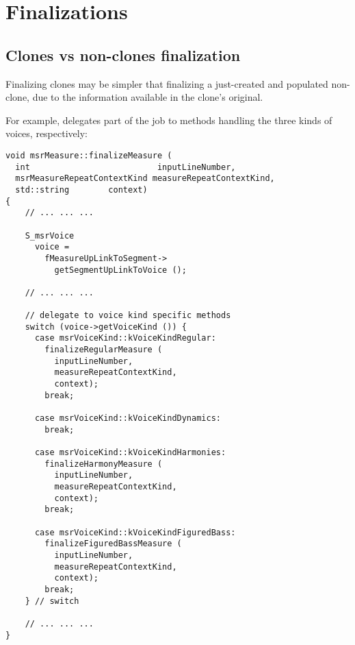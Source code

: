 



\chapter{Finalizations}

\section{Clones vs non-clones finalization}

Finalizing clones may be simpler that finalizing a just-created and populated non-clone, due to the information available in the clone's original.

For example,  delegates part of the job to methods handling the three kinds of voices, respectively:
\begin{lstlisting}[language=CPlusPlus]
void msrMeasure::finalizeMeasure (
  int                          inputLineNumber,
  msrMeasureRepeatContextKind measureRepeatContextKind,
  std::string        context)
{
	// ... ... ...

    S_msrVoice
      voice =
        fMeasureUpLinkToSegment->
          getSegmentUpLinkToVoice ();

	// ... ... ...

    // delegate to voice kind specific methods
    switch (voice->getVoiceKind ()) {
      case msrVoiceKind::kVoiceKindRegular:
        finalizeRegularMeasure (
          inputLineNumber,
          measureRepeatContextKind,
          context);
        break;

      case msrVoiceKind::kVoiceKindDynamics:
        break;

      case msrVoiceKind::kVoiceKindHarmonies:
        finalizeHarmonyMeasure (
          inputLineNumber,
          measureRepeatContextKind,
          context);
        break;

      case msrVoiceKind::kVoiceKindFiguredBass:
        finalizeFiguredBassMeasure (
          inputLineNumber,
          measureRepeatContextKind,
          context);
        break;
    } // switch

	// ... ... ...
}
\end{lstlisting}

